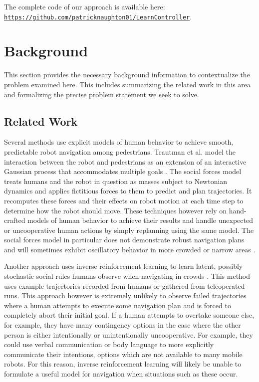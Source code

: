 \documentclass[letterpaper]{article}
\begin{document}
		The complete code of our approach is available here: \texttt{\url{https://github.com/patricknaughton01/LearnController}}.
	\section{Background}\label{sec:background}
		This section provides the necessary background information to contextualize the problem examined here. This includes summarizing the related work in this area and formalizing the precise problem statement we seek to solve.
		 
		\subsection{Related Work}
			Several methods use explicit models of human behavior to achieve smooth, predictable robot navigation among pedestrians. Trautman et al. model the interaction between the robot and pedestrians as an extension of an interactive Gaussian process that accommodates multiple goals \cite{caseforcoop}. The social forces model \cite{sfm} treats humans and the robot in question as masses subject to Newtonian dynamics and applies fictitious forces to them to predict and plan trajectories. It recomputes these forces and their effects on robot motion at each time step to determine how the robot should move. These techniques however rely on hand-crafted models of human behavior to achieve their results and handle unexpected or uncooperative human actions by simply replanning using the same model. The social forces model in particular does not demonstrate robust navigation plans and will sometimes exhibit oscillatory behavior in more crowded or narrow areas \cite{sfm}. 
			
			Another approach uses inverse reinforcement learning to learn latent, possibly stochastic social rules humans observe when navigating in crowds \cite{socialirl}. This method uses example trajectories recorded from humans or gathered from teleoperated runs. This approach however is extremely unlikely to observe failed trajectories where a human attempts to execute some navigation plan and is forced to completely abort their initial goal. If a human attempts to overtake someone else, for example, they have many contingency options in the case where the other person is either intentionally or unintentionally uncooperative. For example, they could use verbal communication or body language to more explicitly communicate their intentions, options which are not available to many mobile robots. For this reason, inverse reinforcement learning will likely be unable to formulate a useful model for navigation when situations such as these occur.
			
\end{document}
